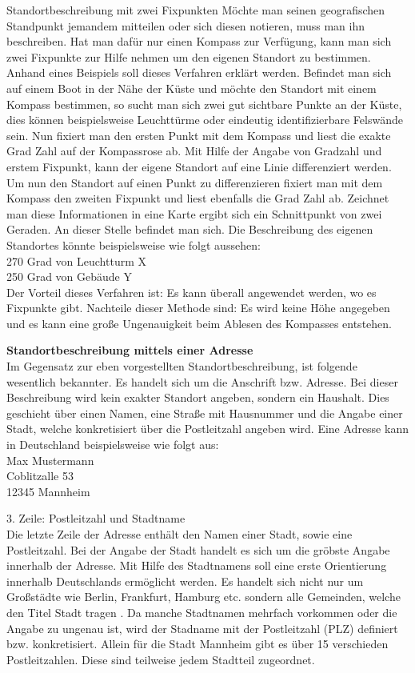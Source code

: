 Standortbeschreibung mit zwei Fixpunkten
Möchte man seinen geografischen Standpunkt jemandem mitteilen oder sich diesen notieren, muss man ihn beschreiben. Hat man dafür nur einen Kompass zur Verfügung, kann man sich zwei Fixpunkte zur Hilfe nehmen um den eigenen Standort zu bestimmen.
Anhand eines Beispiels soll dieses Verfahren erklärt werden. Befindet man sich auf einem Boot in der Nähe der Küste und möchte den Standort mit einem Kompass bestimmen, so sucht man sich zwei gut sichtbare Punkte an der Küste, dies können beispielsweise Leuchttürme oder eindeutig identifizierbare Felswände sein. Nun fixiert man den ersten Punkt mit dem Kompass und liest die exakte Grad Zahl auf der Kompassrose ab. Mit Hilfe der Angabe von Gradzahl und erstem Fixpunkt, kann der eigene Standort auf eine Linie differenziert werden. Um nun den Standort auf einen Punkt zu differenzieren fixiert man mit dem Kompass den zweiten Fixpunkt und liest ebenfalls die Grad Zahl ab. Zeichnet man diese Informationen in eine Karte ergibt sich ein Schnittpunkt von zwei Geraden. An dieser Stelle befindet man sich. Die Beschreibung des eigenen Standortes könnte beispielsweise wie folgt aussehen:
\\270 Grad von Leuchtturm X
\\250 Grad von Gebäude Y
\\Der Vorteil dieses Verfahren ist: Es kann überall angewendet werden, wo es Fixpunkte gibt.
Nachteile dieser Methode sind: Es wird keine Höhe angegeben und es kann eine große Ungenauigkeit beim Ablesen des Kompasses entstehen.

\textbf{Standortbeschreibung mittels einer Adresse}
\\Im Gegensatz zur eben vorgestellten Standortbeschreibung, ist folgende wesentlich bekannter. Es handelt sich um die Anschrift bzw. Adresse. Bei dieser Beschreibung wird kein exakter Standort angeben, sondern ein Haushalt. Dies geschieht über einen Namen, eine Straße mit Hausnummer und die Angabe einer Stadt, welche konkretisiert über die Postleitzahl angeben wird.  
Eine Adresse kann in Deutschland beispielsweise wie folgt aus:
\\Max Mustermann 
\\Coblitzalle 53
\\12345 Mannheim


3. Zeile: Postleitzahl und Stadtname
\\Die letzte Zeile der Adresse enthält den Namen einer Stadt, sowie eine Postleitzahl. Bei der Angabe der Stadt handelt es sich um die gröbste Angabe innerhalb der Adresse. Mit Hilfe des Stadtnamens soll eine erste Orientierung innerhalb Deutschlands ermöglicht werden. Es handelt sich nicht nur um Großstädte wie Berlin, Frankfurt, Hamburg etc. sondern alle Gemeinden, welche den Titel Stadt tragen .
Da manche Stadtnamen mehrfach vorkommen oder die Angabe zu ungenau ist, wird der Stadname mit der Postleitzahl (PLZ) definiert bzw. konkretisiert. Allein für die Stadt Mannheim gibt es über 15 verschieden Postleitzahlen. Diese sind teilweise jedem Stadtteil zugeordnet.



